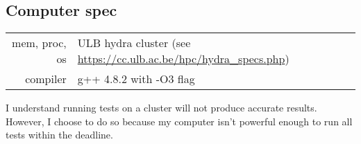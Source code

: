 \subsection{Computer spec}

\begin{tabular}{rl}
mem, proc, os & ULB hydra cluster (see {\small\url{https://cc.ulb.ac.be/hpc/hydra_specs.php}})\\
compiler & g++ 4.8.2 with -O3 flag\\
\end{tabular}

I understand running tests on a cluster will not produce accurate results. However, I choose to do so because my computer isn't powerful enough to run all tests within the deadline.
